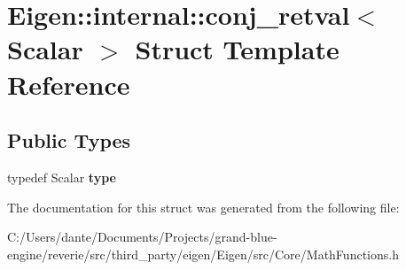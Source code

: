 \hypertarget{struct_eigen_1_1internal_1_1conj__retval}{}\section{Eigen\+::internal\+::conj\+\_\+retval$<$ Scalar $>$ Struct Template Reference}
\label{struct_eigen_1_1internal_1_1conj__retval}
\subsection*{Public Types}
\begin{DoxyCompactItemize}
\item 
\mbox{\label{struct_eigen_1_1internal_1_1conj__retval_a9443dafde5f442b5bc4fb5cc4ec7205f}} 
typedef Scalar {\bfseries type}
\end{DoxyCompactItemize}


The documentation for this struct was generated from the following file\+:\begin{DoxyCompactItemize}
\item 
C\+:/\+Users/dante/\+Documents/\+Projects/grand-\/blue-\/engine/reverie/src/third\+\_\+party/eigen/\+Eigen/src/\+Core/Math\+Functions.\+h\end{DoxyCompactItemize}
